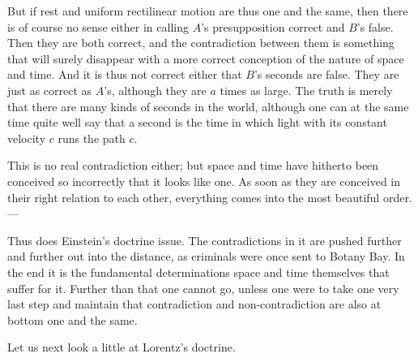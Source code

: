 \documentclass[12pt,a4paper]{article}
\begin{document}
But if rest and uniform rectilinear motion are thus one and the same, then
there is of course no sense either in calling $A$'s presupposition correct and
$B$'s false. Then they are both correct, and the contradiction between them is
something that will surely disappear with a more correct conception of the
nature of space and time. And it is thus not correct either that $B$'s seconds
are false. They are just as correct as $A$'s, although they are $a$ times as
large. The truth is merely that there are many kinds of seconds in the world,
although one can at the same time quite well say that a second is the time in
which light with its constant velocity $c$ runs the path $c$.

This is no real contradiction either; but space and time have hitherto been
conceived so incorrectly that it looks like one. As soon as they are conceived
in their right relation to each other, everything comes into the most
beautiful order. ---

Thus does Einstein's doctrine issue. The contradictions in it are pushed
further and further out into the distance, as criminals were once sent to
Botany Bay. In the end it is the fundamental determinations space and time
themselves that suffer for it. Further than that one cannot go, unless one
were to take one very last step and maintain that contradiction and
non-contradiction are also at bottom one and the same.

Let us next look a little at Lorentz's doctrine.
\end{document}
